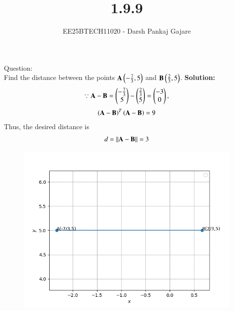 \documentclass[journal,12pt,onecolumn]{IEEEtran}
\begin{document}
\title{1.9.9}
\author{EE25BTECH11020 - Darsh Pankaj Gajare}
{\let\newpage\relax\maketitle}
Question:\\
Find the distance between the points $\mathbf{A}\left(-\frac{7}{3},5\right)$ and $\mathbf{B}\left(\frac{2}{3},5\right)$.
\textbf{Solution:}
\begin{align}
	\because \mathbf{A}-\mathbf{B}=\begin{pmatrix}-\frac{7}{3}\\5\end{pmatrix}-\begin{pmatrix}\frac{2}{3}\\5\end{pmatrix}=\begin{pmatrix}-3\\0\end{pmatrix},
\end{align}
\begin{align}
	\left(\mathbf{A}-\mathbf{B}\right)^T\left(\mathbf{A}-\mathbf{B}\right)=9
\end{align}
Thus, the desired distance is
\begin{align}
	d=\left\lVert\mathbf{A}-\mathbf{B}\right\rVert=3
\end{align}
\begin{figure}[H]
	\centering
	\includegraphics[scale=0.5]{img}
	\caption*{}
	\label{img}
\end{figure}
\end{document}
